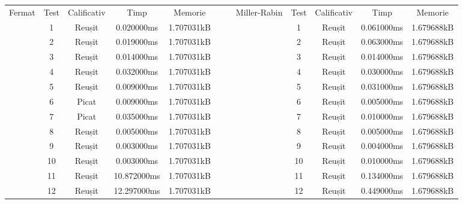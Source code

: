 \documentclass[runningheads]{llncs}
\begin{document}
\begin{table}[H]
    \begin{tabular}{|c|c|c|c|c|cc|c|c|c|c|c|}
    \cline{1-5} \cline{8-12}
    Fermat & Test & Calificativ & Timp        & Memorie    &  &  & Miller-Rabin & Test & Calificativ & Timp       & Memorie    \\ \cline{1-5} \cline{8-12} 
           & 1    & Reușit      & 0.020000ms  & 1.707031kB &  &  &              & 1    & Reușit      & 0.061000ms & 1.679688kB \\ \cline{1-5} \cline{8-12} 
           & 2    & Reușit      & 0.019000ms  & 1.707031kB &  &  &              & 2    & Reușit      & 0.063000ms & 1.679688kB \\ \cline{1-5} \cline{8-12} 
           & 3    & Reușit      & 0.014000ms  & 1.707031kB &  &  &              & 3    & Reușit      & 0.014000ms & 1.679688kB \\ \cline{1-5} \cline{8-12} 
           & 4    & Reușit      & 0.032000ms  & 1.707031kB &  &  &              & 4    & Reușit      & 0.030000ms & 1.679688kB \\ \cline{1-5} \cline{8-12} 
           & 5    & Reușit      & 0.009000ms  & 1.707031kB &  &  &              & 5    & Reușit      & 0.031000ms & 1.679688kB \\ \cline{1-5} \cline{8-12} 
           & 6    & Picat       & 0.009000ms  & 1.707031kB &  &  &              & 6    & Reușit      & 0.005000ms & 1.679688kB \\ \cline{1-5} \cline{8-12} 
           & 7    & Picat       & 0.035000ms  & 1.707031kB &  &  &              & 7    & Reușit      & 0.010000ms & 1.679688kB \\ \cline{1-5} \cline{8-12} 
           & 8    & Reușit      & 0.005000ms  & 1.707031kB &  &  &              & 8    & Reușit      & 0.005000ms & 1.679688kB \\ \cline{1-5} \cline{8-12} 
           & 9    & Reușit      & 0.003000ms  & 1.707031kB &  &  &              & 9    & Reușit      & 0.004000ms & 1.679688kB \\ \cline{1-5} \cline{8-12} 
           & 10   & Reușit      & 0.003000ms  & 1.707031kB &  &  &              & 10   & Reușit      & 0.010000ms & 1.679688kB \\ \cline{1-5} \cline{8-12} 
           & 11   & Reușit      & 10.872000ms & 1.707031kB &  &  &              & 11   & Reușit      & 0.134000ms & 1.679688kB \\ \cline{1-5} \cline{8-12} 
           & 12   & Reușit      & 12.297000ms & 1.707031kB &  &  &              & 12   & Reușit      & 0.449000ms & 1.679688kB \\ \cline{1-5} \cline{8-12} 

\end{tabular}
\end{table}
\end{document}
